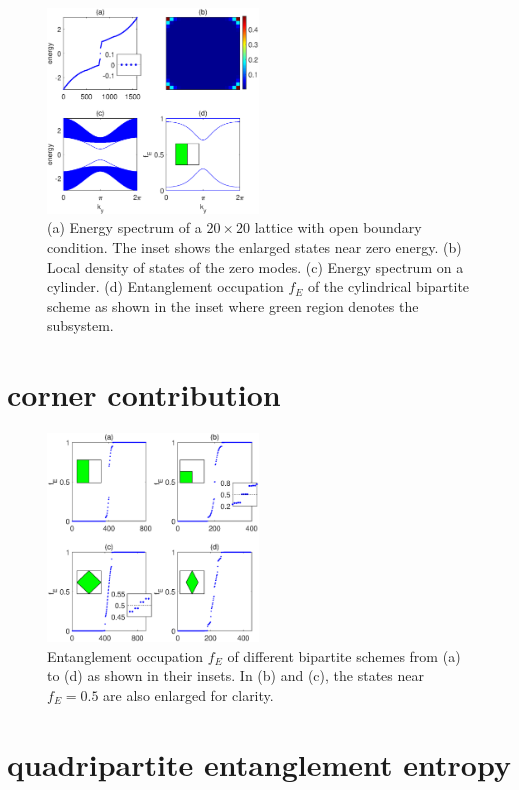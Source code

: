 \documentclass[aps,twocolumn,superscriptaddress]{revtex4-1}
\begin{document}
\begin{figure}
    \includegraphics[width=0.5\textwidth]{model.eps}
    \caption{\label{fig:model} (a) Energy spectrum of a $20\times20$ lattice with open boundary condition.
    The inset shows the enlarged states near zero energy. (b) Local density of states of the zero modes.
    (c) Energy spectrum on a cylinder. (d) Entanglement occupation $f_E$ of the cylindrical bipartite
    scheme as shown in the inset where green region denotes the subsystem. }
\end{figure}

\section{corner contribution}

\begin{figure}
    \includegraphics[width=0.5\textwidth]{subshape.eps}
    \caption{\label{fig:subshape} Entanglement occupation $f_E$ of different bipartite schemes from
    (a) to (d) as shown in their insets. In (b) and (c), the states near $f_E=0.5$ are also enlarged
    for clarity. }
\end{figure}

\section{quadripartite entanglement entropy}
\end{document}
